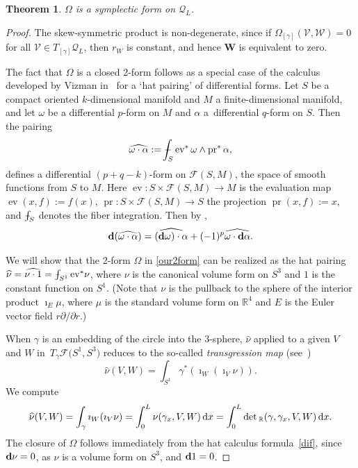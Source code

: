 \documentclass[pdftex]{sigma}
\def\Xint#1{\mathchoice
{\XXint\displaystyle\textstyle{#1}}%
{\XXint\textstyle\scriptstyle{#1}}%
{\XXint\scriptstyle\scriptscriptstyle{#1}}%
{\XXint\scriptscriptstyle\scriptscriptstyle{#1}}%
\!\int}
\def\XXint#1#2#3{{\setbox0=\hbox{$#1{#2#3}{\int}$ }
\vcenter{\hbox{$#2#3$ }}\kern-.6\wd0}}
\def\dashint{\Xint-}
\newcommand\Legq{\mathcal Q}
\newcommand\VW{\mathbf W}
\newcommand\qV{\mathcal V}%
\newcommand\qW{\mathcal W}
\newcommand{\dx}{\,{\rm d}x}
\def\gam{\gamma} %
\def\di{\partial}
\def\R{\mathbb R}
\numberwithin{equation}{section}
\newtheorem{Theorem}{Theorem}[section]
\begin{document}
\begin{Theorem} $\Omega$ is a symplectic form on $\Legq_L$.
\end{Theorem}
\begin{proof}
The skew-symmetric product is non-degenerate, since
if $\Omega_{[\gamma]}(\qV, \qW) = 0$
for all $\qV \in T_{[\gamma]} \Legq_L$, then $r_W$ is constant, and hence $\VW$ is equivalent to zero.

\newcommand{\ev}{\operatorname{ev}}
\newcommand{\pr}{\operatorname{pr}}
The fact that $\Omega$ is a closed 2-form follows as a special case of the calculus developed by Vizman in~\cite{V11} for a `hat pairing' of differential forms. Let $S$ be a compact oriented $k$-dimensional manifold and $M$ a finite-dimensional manifold, and let $\omega$ be a differential $p$-form on $M$ and $\alpha$ a~differential $q$-form on $S$. Then the pairing
\begin{equation*}
\widehat{\omega \cdot \alpha}:=\dashint_S \ev^* \omega \wedge \pr^* \alpha,
\end{equation*}
defines a differential $(p+q-k)$-form on $\mathcal{F}(S,M)$, the space of smooth functions from $S$ to $M$. Here $\ev\colon S \times \mathcal{F}(S,M) \rightarrow M$ is the evaluation map $\ev(x, f):=f(x)$, $\pr\colon S \times \mathcal{F}(S,M) \rightarrow S$ the projection
 $\pr(x, f):=x$, and $\dashint_S$ denotes the fiber integration. Then by \cite[Theorem 1]{V11},
 \begin{equation}
 \label{dif}
 {\bf{d}}(\widehat{\omega \cdot \alpha})=\widehat{({\bf d} \omega) \cdot \alpha}+(-1)^p \widehat{\omega \cdot {\bf d} \alpha}.
 \end{equation}



We will show that the 2-form $\Omega$ in \eqref{our2form} can be realized as the hat pairing $\widehat\nu =\widehat{\nu \cdot 1}=\dashint_{S^1} {\rm ev}^* \nu$, where $\nu$ is the canonical volume form on $S^3$ and $1$ is the constant function on $S^1$. \big(Note that $\nu$ is the pullback to the sphere of the interior product $\imath_E \mu$, where $\mu$ is the standard volume form on $\R^4$ and $E$ is the Euler vector field $r\di/\di r$.\big)


When $\gam$ is an embedding of the circle into the 3-sphere, $\widehat\nu$ applied to a
given $V$ and $W$ in~$T_\gamma \mathcal{F}\bigl(S^1, S^3\bigr)$ reduces to the so-called {\em transgression map} (see~\cite{V11})
\[
\widehat\nu (V, W)=\int_{S^1}\gamma^*(\imath_W (\imath_V \nu) ).
\]
We compute
\[
\widehat\nu (V, W)=\int_\gamma \imath_W (\imath_V\nu) =\int_0^L \nu (\gam_x, V, W) \dx=\int_0^L \det{}_\R( \gam, \gam_x, V, W) \dx.
\]
The closure of $\Omega$ follows immediately from the hat calculus formula~\eqref{dif}, since
${\bf d} \nu=0$, as $\nu$ is a volume form on $S^3$, and ${\bf d} 1=0$.
\end{proof}
\end{document}
